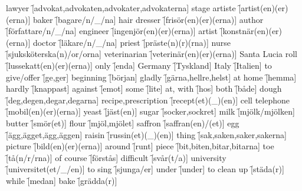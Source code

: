\begin{questions}
    \begin{multicols}{2}
        \raggedcolumns
        \question lawyer \f[advokat,advokaten,advokater,advokaterna]
        \question stage artiste \f[artist(en)(er)(erna)]
        \question baker \f[bagare/n/\_/na]
        \question hair dresser \f[frisör(en)(er)(erna)]
        \question author \f[författare/n/\_/na]
        \question engineer \f[ingenjör(en)(er)(erna)]
        \question artist \f[konstnär(en)(er)(erna)]
        \question doctor \f[läkare/n/\_/na]
        \question priest \f[präste(n)(r)(rna)]
        \question nurse \f[sjuksköterska(n)/or/orna]
        \question veterinarian \f[veterinär(en)(er)(erna)]
        \question Santa Lucia roll \f[lussekatt(en)(er)(erna)]
        \question only \f[enda]
        \question Germany \f[Tyskland]
        \question Italy \f[Italien]
        \question to give/offer \f[ge,ger]
        \question beginning \f[början]
        \question gladly \f[gärna,hellre,helst]
        \question at home \f[hemma]
        \question hardly \f[knappast]
        \question against \f[emot]
        \question some \f[lite]
        \question at, with \f[hos]
        \question both \f[både]
        \question dough \f[deg,degen,degar,degarna]
        \question recipe,prescription \f[recept(et)(\_)(en)]
        \question cell telephone \f[mobil(en)(er)(erna)]
        \question yeast \f[jäst(en)]
        \question sugar \f[socker,sockret]
        \question milk \f[mjölk/mjölken]
        \question butter \f[smör(et)]
        \question flour \f[mjöl,mjölet]
        \question saffron \f[saffran(en)/(et)]
        \question egg \f[ägg,ägget,ägg,äggen]
        \question raisin \f[russin(et)(\_)(en)]
        \question thing \f[sak,saken,saker,sakerna]
        \question picture \f[bild(en)(er)(erna)]
        \question around \f[runt]
        \question piece \f[bit,biten,bitar,bitarna]
        \question toe \f[tå(n/r/rna)]
        \question of course \f[förstås]
        \question difficult \f[svår(t/a)]
        \question university \f[universitet(et/\_/en)]
        \question to sing \f[sjunga/er]
        \question under \f[under]
        \question to clean up \f[städa(r)]
        \question while \f[medan]
        \question bake \f[grädda(r)]
    \end{multicols}
\end{questions}
